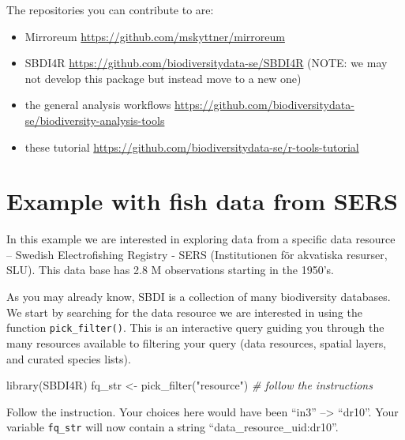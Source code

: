 \documentclass[
  10pt,
]{article}
\newenvironment{Shaded}{\begin{snugshade}}{\end{snugshade}}
\newcommand{\CommentTok}[1]{\textcolor[rgb]{0.56,0.35,0.01}{\textit{#1}}}
\newcommand{\FunctionTok}[1]{\textcolor[rgb]{0.00,0.00,0.00}{#1}}
\newcommand{\NormalTok}[1]{#1}
\newcommand{\OtherTok}[1]{\textcolor[rgb]{0.56,0.35,0.01}{#1}}
\newcommand{\StringTok}[1]{\textcolor[rgb]{0.31,0.60,0.02}{#1}}
\providecommand{\tightlist}{%
  \setlength{\itemsep}{0pt}\setlength{\parskip}{0pt}}
\begin{document}
The repositories you can contribute to are:

\begin{itemize}
\tightlist
\item
  Mirroreum \url{https://github.com/mskyttner/mirroreum}\\
\item
  SBDI4R \url{https://github.com/biodiversitydata-se/SBDI4R} (NOTE: we may not develop this package but instead move to a new one)\\
\item
  the general analysis workflows \url{https://github.com/biodiversitydata-se/biodiversity-analysis-tools}\\
\item
  these tutorial \url{https://github.com/biodiversitydata-se/r-tools-tutorial}
\end{itemize}

\hypertarget{example-with-fish-data-from-sers}{%
\section{Example with fish data from SERS}\label{example-with-fish-data-from-sers}}

In this example we are interested in exploring data from a specific data resource -- Swedish Electrofishing Registry - SERS (Institutionen för akvatiska resurser, SLU). This data base has 2.8 M observations starting in the 1950's.

As you may already know, SBDI is a collection of many biodiversity databases. We start by searching for the data resource we are interested in using the function \texttt{pick\_filter()}. This is an interactive query guiding you through the many resources available to filtering your query (data resources, spatial layers, and curated species lists).

\begin{Shaded}
\begin{Highlighting}[]
\FunctionTok{library}\NormalTok{(SBDI4R)}
\NormalTok{fq\_str }\OtherTok{\textless{}{-}} \FunctionTok{pick\_filter}\NormalTok{(}\StringTok{"resource"}\NormalTok{) }
\CommentTok{\# follow the instructions }
\end{Highlighting}
\end{Shaded}

Follow the instruction. Your choices here would have been ``in3'' --\textgreater{} ``dr10''. Your variable \texttt{fq\_str} will now contain a string ``data\_resource\_uid:dr10''.
\end{document}
